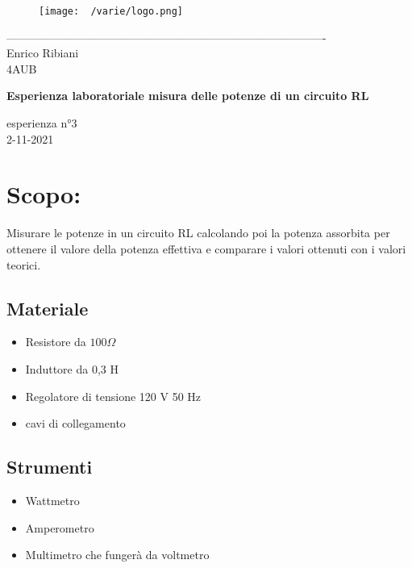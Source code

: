 \documentclass[12pt]{article}
\begin{document}
    \begin{titlepage}
    \begin{center}
\begin{figure}
    \centering
    \texttt{[image: ~/varie/logo.png]}
    \label{fig:logo}
\end{figure}
-------------------------------------------------------------------------------------\\
\vspace{2\baselineskip}
\large Enrico Ribiani\\
\large 4AUB\\
\vfill

\Huge{\textbf{Esperienza laboratoriale misura delle potenze di un circuito RL}}\\
\vfill

\LARGE{esperienza n°3}\\
\vfill
\large{2-11-2021}
\end{center}
\end{titlepage}
\tableofcontents

\section{Scopo:}
Misurare le potenze in un circuito RL calcolando poi la potenza assorbita per ottenere il valore della potenza effettiva
e comparare i valori ottenuti con i valori teorici.
\subsection{Materiale}
\begin{itemize}
    \item Resistore da $100\Omega$
    \item Induttore da 0,3 H
    \item Regolatore di tensione 120 V 50 Hz
    \item cavi di collegamento
\end{itemize}
    \subsection{Strumenti}
    \begin{itemize}
        \item Wattmetro
        \item Amperometro
        \item Multimetro che fungerà da voltmetro
    \end{itemize}
\vfill
\end{document}
